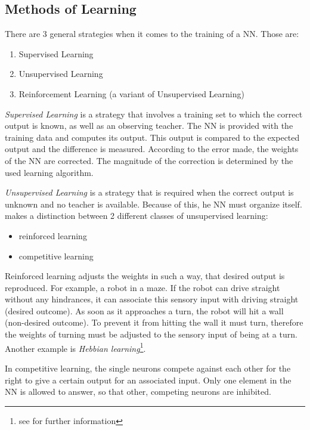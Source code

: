 \subsection{Methods of Learning}
There are 3 general strategies when it comes to the training of a NN\cite{Bourg04}. Those are:

\begin{enumerate}
	\item Supervised Learning
	\item Unsupervised Learning
	\item Reinforcement Learning (a variant of Unsupervised Learning\cite{Rojas96})
\end{enumerate}

\emph{Supervised Learning} is a strategy that involves a training set to which the correct output is known, as well as an observing teacher. The NN is provided with the training data and computes its output. This output is compared to the expected output and the difference is measured. According to the error made, the weights of the NN are corrected. The magnitude of the correction is determined by the used learning algorithm\cite{Rojas96}.

\emph{Unsupervised Learning} is a strategy that is required when the correct output is unknown and no teacher is available. Because of this, he NN must organize itself\cite{Shiffman12}. \cite{Rojas96} makes a distinction between 2 different classes of unsupervised learning:

\begin{itemize}
	\item reinforced learning
	\item competitive learning
\end{itemize}

Reinforced learning adjusts the weights in such a way, that desired output is reproduced. For example, a robot in a maze. If the robot can drive straight without any hindrances, it can associate this sensory input with driving straight (desired outcome). As soon as it approaches a turn, the robot will hit a wall (non-desired outcome). To prevent it from hitting the wall it must turn, therefore the weights of turning must be adjusted to the sensory input of being at a turn. Another example is \emph{Hebbian learning}\footnote{see \cite{Rojas96} for further information}\cite{Rojas96}.

In competitive learning, the single neurons compete against each other for the right to give a certain output for an associated input. Only one element in the NN is allowed to answer, so that other, competing neurons are inhibited\cite{Rojas96}.


